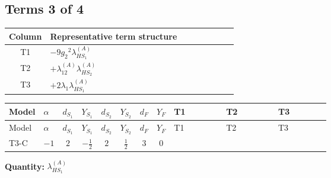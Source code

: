 \documentclass[8pt]{article}
\begin{document}
\begin{landscape}
\subsection*{Terms 3 of 4}
\begin{center}
\begin{tabular}{@{}c >{\raggedright\arraybackslash}p{0.82\linewidth}@{}}
\toprule
Column & Representative term structure \\
\midrule
T1 & \(\displaystyle -9 {g_2}^2 {\lambda_{HS_1}^{(A)}}\) \\
\midrule
T2 & \(\displaystyle +{\lambda_{12}^{(A)}} {\lambda_{HS_2}^{(A)}}\) \\
\midrule
T3 & \(\displaystyle +2 {\lambda_1} {\lambda_{HS_1}^{(A)}}\) \\
\midrule
\bottomrule
\end{tabular}
\end{center}
\smallskip
\tiny
\begin{longtable}{@{}llcccccc >{\raggedright\arraybackslash}p{0.21\linewidth} >{\raggedright\arraybackslash}p{0.21\linewidth} >{\raggedright\arraybackslash}p{0.21\linewidth}@{}}
\toprule
Model & $\alpha$ & $d_{S_1}$ & $Y_{S_1}$ & $d_{S_2}$ & $Y_{S_2}$ & $d_F$ & $Y_F$ & T1 & T2 & T3 \\
\midrule
\endfirsthead
\toprule
Model & $\alpha$ & $d_{S_1}$ & $Y_{S_1}$ & $d_{S_2}$ & $Y_{S_2}$ & $d_F$ & $Y_F$ & T1 & T2 & T3 \\
\midrule
\endhead
T3-C & $-1$ & $2$ & $-\frac{1}{2}$ & $2$ & $\frac{1}{2}$ & $3$ & $0$ & \scriptsize\adjustbox{max width=\linewidth}{$\begin{gathered} -9 {g_2}^2 {\lambda_{HS_1}^{(A)}}\end{gathered}$} & \scriptsize\adjustbox{max width=\linewidth}{$\begin{gathered} +{\lambda_{12}^{(A)}} {\lambda_{HS_2}^{(A)}}\end{gathered}$} & \scriptsize\adjustbox{max width=\linewidth}{$\begin{gathered} +2 {\lambda_1} {\lambda_{HS_1}^{(A)}}\end{gathered}$} \\
\midrule
\bottomrule
\end{longtable}
\clearpage
\noindent\textbf{Quantity: }$\lambda_{HS_1}^{(A)}$\par\smallskip

\end{landscape}
\end{document}
